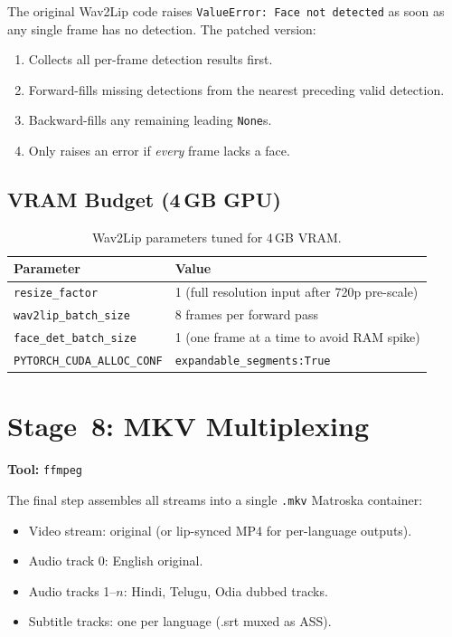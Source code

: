 \documentclass[12pt,a4paper]{article}
\begin{document}
The original Wav2Lip code raises \texttt{ValueError: Face not detected} as
soon as any single frame has no detection.  The patched version:

\begin{enumerate}
  \item Collects all per-frame detection results first.
  \item Forward-fills missing detections from the nearest preceding valid detection.
  \item Backward-fills any remaining leading \texttt{None}s.
  \item Only raises an error if \emph{every} frame lacks a face.
\end{enumerate}

\subsection{VRAM Budget (4\,GB GPU)}

\begin{table}[H]
\centering
\begin{tabularx}{\linewidth}{lX}
\toprule
\textbf{Parameter} & \textbf{Value} \\
\midrule
\texttt{resize\_factor}       & 1 (full resolution input after 720p pre-scale) \\
\texttt{wav2lip\_batch\_size} & 8 frames per forward pass \\
\texttt{face\_det\_batch\_size} & 1 (one frame at a time to avoid RAM spike) \\
\texttt{PYTORCH\_CUDA\_ALLOC\_CONF} & \texttt{expandable\_segments:True} \\
\bottomrule
\end{tabularx}
\caption{Wav2Lip parameters tuned for 4\,GB VRAM.}
\end{table}

\section{Stage~8: MKV Multiplexing}

\textbf{Tool:} \texttt{ffmpeg}

The final step assembles all streams into a single \texttt{.mkv} Matroska
container:

\begin{itemize}
  \item Video stream: original (or lip-synced MP4 for per-language outputs).
  \item Audio track 0: English original.
  \item Audio tracks 1–$n$: Hindi, Telugu, Odia dubbed tracks.
  \item Subtitle tracks: one per language (.srt muxed as ASS).
\end{itemize}
\end{document}
